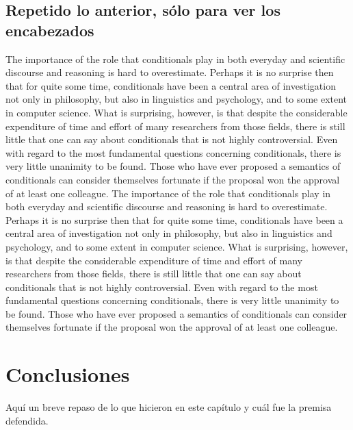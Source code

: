 \subsection{Repetido lo anterior, sólo para ver los encabezados}

\noindent The importance of the role that conditionals play in both everyday and scientific discourse and reasoning is hard to overestimate. \citep{Ariotti1968} %
Perhaps it is no surprise then that for quite some time, conditionals have been a central area of investigation not only in philosophy, but also in linguistics and psychology, and to some extent in computer science.
What is surprising, however, is that despite the considerable expenditure of time and effort of many researchers from those fields, there is still little that one can say about conditionals that is not highly controversial. 
Even with regard to the most fundamental questions concerning conditionals, there is very little unanimity to be found. 
Those who have ever proposed a semantics of conditionals can consider themselves fortunate if the proposal won the approval of at least one colleague. %
The importance of the role that conditionals play in both everyday and scientific discourse and reasoning is hard to overestimate. \citep{Ariotti1968} %
Perhaps it is no surprise then that for quite some time, conditionals have been a central area of investigation not only in philosophy, but also in linguistics and psychology, and to some extent in computer science.
What is surprising, however, is that despite the considerable expenditure of time and effort of many researchers from those fields, there is still little that one can say about conditionals that is not highly controversial. 
Even with regard to the most fundamental questions concerning conditionals, there is very little unanimity to be found. 
Those who have ever proposed a semantics of conditionals can consider themselves fortunate if the proposal won the approval of at least one colleague. %


\section*{Conclusiones} %

\noindent Aquí un breve repaso de lo que hicieron en este capítulo y cuál fue la premisa defendida.